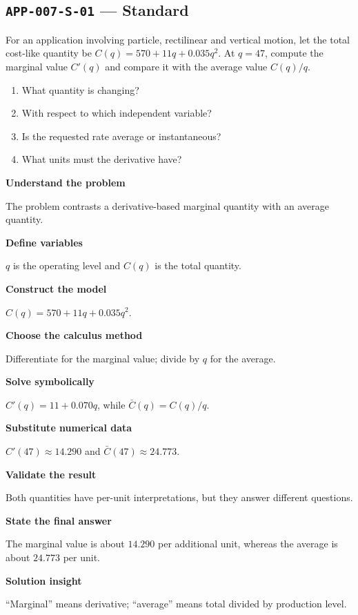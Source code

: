 \documentclass[11pt]{book}
\newcommand{\pid}[1]{\texttt{#1}}
\begin{document}
\subsection*{\pid{APP-007-S-01} — Standard}
\begin{problembox}
For an application involving particle, rectilinear and vertical motion, let the total cost-like quantity be $C(q)=570+11q+0.035q^2$. At $q=47$, compute the marginal value $C'(q)$ and compare it with the average value $C(q)/q$.
\end{problembox}
\begin{promptbox}\begin{enumerate}
\item What quantity is changing?
\item With respect to which independent variable?
\item Is the requested rate average or instantaneous?
\item What units must the derivative have?
\end{enumerate}\end{promptbox}
\begin{solutionbox}
\textbf{Understand the problem}\par The problem contrasts a derivative-based marginal quantity with an average quantity.\par\medskip
\textbf{Define variables}\par $q$ is the operating level and $C(q)$ is the total quantity.\par\medskip
\textbf{Construct the model}\par $C(q)=570+11q+0.035q^2$.\par\medskip
\textbf{Choose the calculus method}\par Differentiate for the marginal value; divide by $q$ for the average.\par\medskip
\textbf{Solve symbolically}\par $C'(q)=11+0.070q$, while $\bar C(q)=C(q)/q$.\par\medskip
\textbf{Substitute numerical data}\par $C'(47)\approx 14.290$ and $\bar C(47)\approx 24.773$.\par\medskip
\textbf{Validate the result}\par Both quantities have per-unit interpretations, but they answer different questions.\par\medskip
\textbf{State the final answer}\par The marginal value is about $14.290$ per additional unit, whereas the average is about $24.773$ per unit.\par\medskip
\textbf{Solution insight}\par “Marginal” means derivative; “average” means total divided by production level.\par\medskip
\end{solutionbox}
\end{document}
